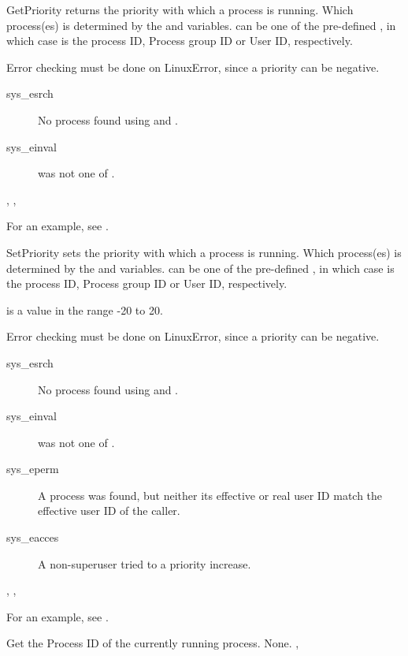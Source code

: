 

{
GetPriority returns the priority with which a process is running.
Which process(es) is determined by the  and  variables.
 can be one of the pre-defined , in which case  is the process ID, Process group ID or
User ID, respectively.
}
{
 Error checking must be done on LinuxError, since a priority can be negative.
 \begin{description}
 \item[sys\_esrch] No process found using  and .
 \item[sys\_einval]  was not one of .
 \end{description}
 }
{, , }

For an example, see .

{
SetPriority sets the priority with which a process is running.
Which process(es) is determined by the  and  variables.
 can be one of the pre-defined , in which case  is the process ID, Process group ID or
User ID, respectively.

 is a value in the range -20 to 20.
}
{
 Error checking must be done on LinuxError, since a priority can be negative.
 \begin{description}
 \item[sys\_esrch] No process found using  and .
 \item[sys\_einval]  was not one of .
 \item[sys\_eperm] A process was found, but neither its effective or real
 user ID match the effective user ID of the caller.
 \item [sys\_eacces] A non-superuser tried to a priority increase.
 \end{description}
 }
{, , }

For an example, see .

{ Get the Process ID of the currently running process.}
{None.}
{, }




